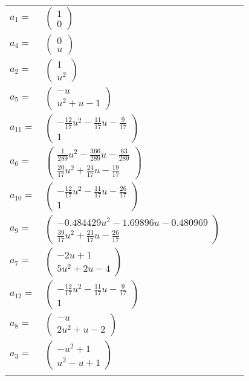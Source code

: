 \documentclass[1p]{elsarticle_modified}
\theoremstyle{definition}
\begin{document}
\begin{tabular}{m{7pt} m{180pt} m{7pt} m{180pt} }
\flushright $a_{1}=$&$\begin{pmatrix}1\\0\end{pmatrix}$ \\
\flushright $a_{4}=$&$\begin{pmatrix}0\\u\end{pmatrix}$ \\
\flushright $a_{2}=$&$\begin{pmatrix}1\\u^2\end{pmatrix}$ \\
\flushright $a_{5}=$&$\begin{pmatrix}- u\\u^2+u-1\end{pmatrix}$ \\
\flushright $a_{11}=$&$\begin{pmatrix}-\frac{12}{17} u^2-\frac{11}{17} u-\frac{9}{17}\\1\end{pmatrix}$ \\
\flushright $a_{6}=$&$\begin{pmatrix}\frac{1}{289} u^2-\frac{366}{289} u-\frac{63}{289}\\\frac{20}{17} u^2+\frac{24}{17} u-\frac{19}{17}\end{pmatrix}$ \\
\flushright $a_{10}=$&$\begin{pmatrix}-\frac{12}{17} u^2-\frac{11}{17} u-\frac{26}{17}\\1\end{pmatrix}$ \\
\flushright $a_{9}=$&$\begin{pmatrix}-0.484429 u^{2}-1.69896 u-0.480969\\\frac{39}{17} u^2+\frac{23}{17} u-\frac{26}{17}\end{pmatrix}$ \\
\flushright $a_{7}=$&$\begin{pmatrix}-2 u+1\\5 u^2+2 u-4\end{pmatrix}$ \\
\flushright $a_{12}=$&$\begin{pmatrix}-\frac{12}{17} u^2-\frac{11}{17} u-\frac{9}{17}\\1\end{pmatrix}$ \\
\flushright $a_{8}=$&$\begin{pmatrix}- u\\2 u^2+u-2\end{pmatrix}$ \\
\flushright $a_{3}=$&$\begin{pmatrix}- u^2+1\\u^2- u+1\end{pmatrix}$\\&\end{tabular}
\end{document}

